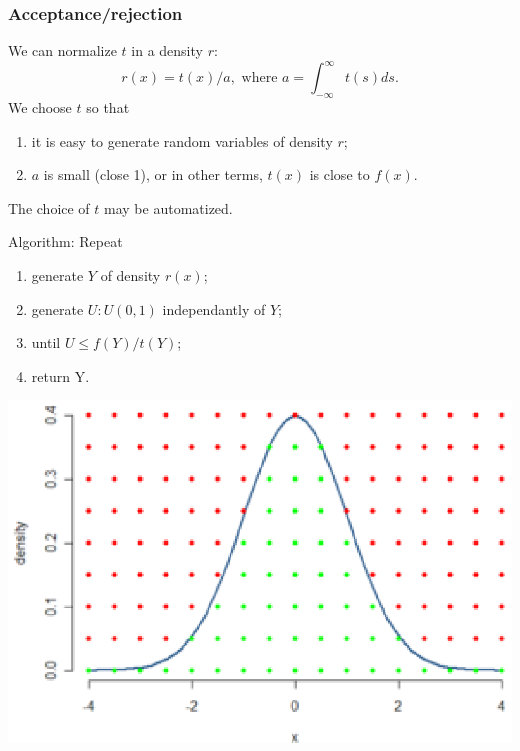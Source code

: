 \documentclass{beamer}
\begin{document}
	\begin{frame}
		\frametitle{Acceptance/rejection}
		
		We can normalize $t$ in a density $r$:
		\[
		r(x) = t(x)/a,\mbox{ where }a = \int_{-\infty}^{\infty} t(s)ds.
		\]
		We choose $t$ so that
		\begin{enumerate}
			\item
			it is easy to generate random variables of density $r$;
			\item
			$a$ is small (close 1), or in other terms, $t(x)$ is close to $f(x)$.
		\end{enumerate}
		The choice of $t$ may be automatized.
		
		\mbox{}
		
		\begin{minipage}{0.52\linewidth}
			{\blue Algorithm}: Repeat
			\begin{enumerate}
				\item
				generate $Y$ of density $r(x)$;
				\item
				generate $U: U (0, 1)$ independantly of $Y$;
				\item
				until $U \leq f (Y )/t(Y )$;
				\item
				return Y.
			\end{enumerate}
		\end{minipage}
		\begin{minipage}{0.47\linewidth}
			\includegraphics[width=\linewidth]{imgs/NormalRejectGrid.eps}
		\end{minipage}
		
	\end{frame}
	
\end{document}
